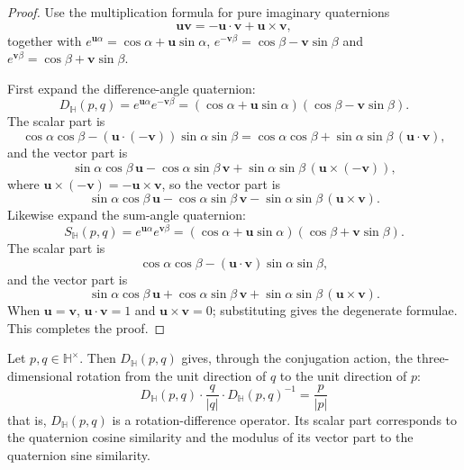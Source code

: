 \begin{proof}
Use the multiplication formula for pure imaginary quaternions
\[
\mathbf u\mathbf v=-\mathbf u\cdot\mathbf v+\mathbf u\times\mathbf v,
\]
together with $e^{\mathbf u\alpha}=\cos\alpha+\mathbf u\sin\alpha$, $e^{-\mathbf v\beta}=\cos\beta-\mathbf v\sin\beta$ and $e^{\mathbf v\beta}=\cos\beta+\mathbf v\sin\beta$.

First expand the difference-angle quaternion:
\[
D_{\mathbb H}(p,q)=e^{\mathbf u\alpha}e^{-\mathbf v\beta}
=
(\cos\alpha+\mathbf u\sin\alpha)(\cos\beta-\mathbf v\sin\beta).
\]
The scalar part is
\[
\cos\alpha\cos\beta-(\mathbf u\cdot(-\mathbf v))\sin\alpha\sin\beta
=
\cos\alpha\cos\beta+\sin\alpha\sin\beta\,(\mathbf u\cdot\mathbf v),
\]
and the vector part is
\[
\sin\alpha\cos\beta\,\mathbf u-\cos\alpha\sin\beta\,\mathbf v
+\sin\alpha\sin\beta\,(\mathbf u\times(-\mathbf v)),
\]
where $\mathbf u\times(-\mathbf v)=-\mathbf u\times\mathbf v$, so the vector part is
\[
\sin\alpha\cos\beta\,\mathbf u-\cos\alpha\sin\beta\,\mathbf v-\sin\alpha\sin\beta\,(\mathbf u\times\mathbf v).
\]
Likewise expand the sum-angle quaternion:
\[
S_{\mathbb H}(p,q)=e^{\mathbf u\alpha}e^{\mathbf v\beta}
=
(\cos\alpha+\mathbf u\sin\alpha)(\cos\beta+\mathbf v\sin\beta).
\]
The scalar part is
\[
\cos\alpha\cos\beta-(\mathbf u\cdot\mathbf v)\sin\alpha\sin\beta,
\]
and the vector part is
\[
\sin\alpha\cos\beta\,\mathbf u+\cos\alpha\sin\beta\,\mathbf v+\sin\alpha\sin\beta\,(\mathbf u\times\mathbf v).
\]
When $\mathbf u=\mathbf v$, $\mathbf u\cdot\mathbf v=1$ and $\mathbf u\times\mathbf v=0$; substituting gives the degenerate formulae. This completes the proof.
\end{proof}

\begin{proposition}\label{prop:quaternion_exp_similarity_rotation_operator}
Let $p,q\in\mathbb H^\times$. Then $D_{\mathbb H}(p,q)$ gives, through the conjugation action, the three-dimensional rotation from the unit direction of $q$ to the unit direction of $p$:
\[
\boxed{
D_{\mathbb H}(p,q)\cdot \frac{q}{|q|}\cdot D_{\mathbb H}(p,q)^{-1}
=
\frac{p}{|p|}
}
\]
that is, $D_{\mathbb H}(p,q)$ is a rotation-difference operator. Its scalar part corresponds to the quaternion cosine similarity and the modulus of its vector part to the quaternion sine similarity.
\end{proposition}

